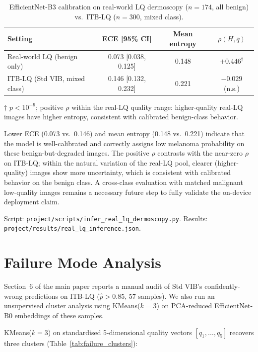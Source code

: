 \documentclass{bmvc2k}
\begin{document}
\begin{table}[h]
\centering
\caption{EfficientNet-B3 calibration on real-world LQ dermoscopy ($n{=}174$, all benign) vs.\ ITB-LQ ($n{=}300$, mixed class).}
\label{tab:real_lq}
\begin{tabular}{lccc}
\toprule
Setting & ECE [95\% CI] & Mean entropy & $\rho(H,\bar q)$ \\
\midrule
Real-world LQ (benign only) & 0.073 [0.038, 0.125] & 0.148 & $+0.446^\dagger$ \\
ITB-LQ (Std VIB, mixed class) & 0.146 [0.132, 0.232] & 0.221 & $-0.029$ (n.s.) \\
\bottomrule
\end{tabular}
\begin{flushleft}
{\footnotesize $\dagger$ $p{<}10^{-9}$; positive $\rho$ within the real-LQ quality range: higher-quality real-LQ images have higher entropy, consistent with calibrated benign-class behavior.}
\end{flushleft}
\end{table}

Lower ECE (0.073 vs.\ 0.146) and mean entropy (0.148 vs.\ 0.221) indicate that the model is well-calibrated and correctly assigns low melanoma probability on these benign-but-degraded images. The positive $\rho$ contrasts with the near-zero $\rho$ on ITB-LQ; within the natural variation of the real-LQ pool, clearer (higher-quality) images show more uncertainty, which is consistent with calibrated behavior on the benign class. A cross-class evaluation with matched malignant low-quality images remains a necessary future step to fully validate the on-device deployment claim.

Script: \texttt{project/scripts/infer\_real\_lq\_dermoscopy.py}.
Results: \texttt{project/results/real\_lq\_inference.json}.

\section{Failure Mode Analysis}
\label{app:failure}

Section~6 of the main paper reports a manual audit of Std VIB's confidently-wrong predictions on ITB-LQ ($\hat p > 0.85$, 57 samples). We also run an unsupervised cluster analysis using KMeans($k{=}3$) on PCA-reduced EfficientNet-B0 embeddings of these samples.

KMeans($k{=}3$) on standardised 5-dimensional quality vectors $[q_1,\ldots,q_5]$ recovers three clusters (Table~\ref{tab:failure_clusters}):
\end{document}
